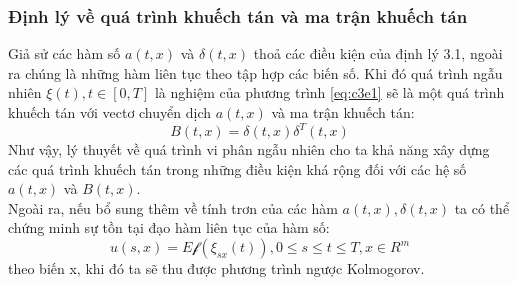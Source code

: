 \documentclass[a4paper]{article}
\numberwithin{equation}{section}
\begin{document}
\subsubsection{Định lý về quá trình khuếch tán và ma trận khuếch tán}
Giả sử các hàm số $a(t,x)$ và $\delta(t,x)$ thoả các điều kiện của định lý 3.1, ngoài ra chúng là những hàm liên tục theo tập hợp các biến số. Khi đó quá trình ngẫu nhiên $\xi(t),t\in[0,T]$ là nghiệm của phương trình \eqref{eq:c3e1} sẽ là một quá trình khuếch tán với vectơ chuyển dịch $a(t,x)$ và ma trận khuếch tán:
\begin{equation*}
	B(t,x)=\delta(t,x)\delta^T(t,x)
\end{equation*}
Như vậy, lý thuyết về quá trình vi phân ngẫu nhiên cho ta khả năng xây dựng các quá trình khuếch tán trong những điều kiện khá rộng đối với các hệ số $a(t,x)$ và $B(t,x)$.\\
Ngoài ra, nếu bổ sung thêm về tính trơn của các hàm $a(t,x),\delta(t,x)$ ta có thể chứng minh sự tồn tại đạo hàm liên tục của hàm số:
\begin{equation*}
	u(s,x)=E\mathscr{f}(\xi_{sx}(t)),0\leq s\leq t\leq T,x\in R^m
\end{equation*}
theo biến x, khi đó ta sẽ thu được phương trình ngược Kolmogorov.\\
\end{document}
